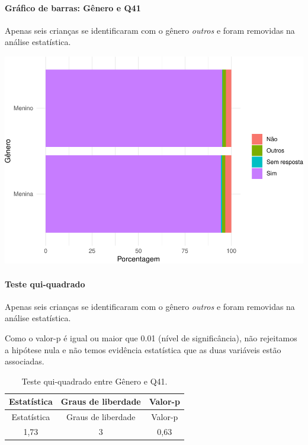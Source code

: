 \documentclass[]{article}
\let\oldparagraph\paragraph
\renewcommand{\paragraph}[1]{\oldparagraph{#1}\mbox{}}
\begin{document}
\hypertarget{gruxe1fico-de-barras-guxeanero-e-q41}{%
\paragraph{Gráfico de barras: Gênero e Q41}\label{gruxe1fico-de-barras-guxeanero-e-q41}}

Apenas seis crianças se identificaram com o gênero \emph{outros} e foram removidas na análise estatística.

\begin{center}\includegraphics[width=0.75\linewidth]{relatorio_covid19_files/figure-latex/unnamed-chunk-1616-1} \end{center}

\hypertarget{teste-qui-quadrado-138}{%
\paragraph{Teste qui-quadrado}\label{teste-qui-quadrado-138}}

Apenas seis crianças se identificaram com o gênero \emph{outros} e foram removidas na análise estatística.

Como o valor-p é igual ou maior que 0.01 (nível de significância), não rejeitamos a hipótese nula e não temos evidência estatística que as duas variáveis estão associadas.

\begin{longtable}[]{@{}ccc@{}}
\caption{\label{tab:unnamed-chunk-1618}Teste qui-quadrado entre Gênero e Q41.}\tabularnewline
\toprule
Estatística & Graus de liberdade & Valor-p\tabularnewline
\midrule
\endfirsthead
\toprule
Estatística & Graus de liberdade & Valor-p\tabularnewline
\midrule
\endhead
1,73 & 3 & 0,63\tabularnewline
\bottomrule
\end{longtable}

\cleardoublepage
\end{document}
